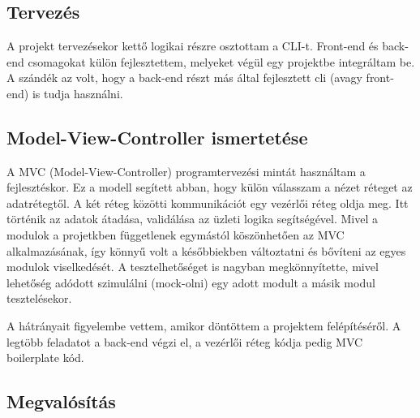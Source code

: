 \chapter{\kli}
\section{Tervezés}
A projekt tervezésekor kettő logikai részre osztottam a CLI-t. Front-end és back-end csomagokat külön fejlesztettem, melyeket végül egy projektbe integráltam be. A szándék az volt, hogy a back-end részt más által fejlesztett cli (avagy front-end) is tudja használni.
\section{Model-View-Controller ismertetése}
A MVC (Model-View-Controller) programtervezési mintát használtam a fejlesztéskor. Ez a modell segített abban, hogy külön válasszam a nézet réteget az adatrétegtől. A két réteg közötti kommunikációt egy vezérlői réteg oldja meg. Itt történik az adatok átadása, validálása az üzleti logika segítségével. Mivel a modulok a projetkben függetlenek egymástól köszönhetően az MVC alkalmazásának, így könnyű volt a későbbiekben változtatni és bővíteni az egyes modulok viselkedését. A tesztelhetőséget is nagyban megkönnyítette, mivel lehetőség adódott szimulálni (mock-olni) egy adott modult a másik modul tesztelésekor.

A hátrányait figyelembe vettem, amikor döntöttem a projektem felépítéséről. A legtöbb feladatot a back-end végzi el, a vezérlői réteg kódja pedig MVC boilerplate kód.
\section{Megvalósítás}
